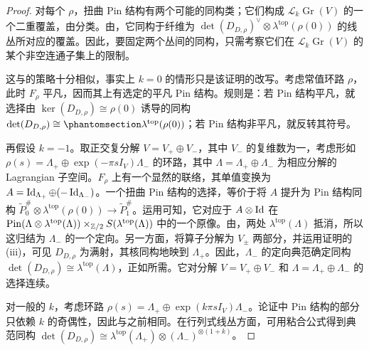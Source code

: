 \begin{proof}
对每个 $\rho$，扭曲 Pin 结构有两个可能的同构类；它们构成 $\mathcal L_k\operatorname{Gr}(V)$ 的一个二重覆盖，由分类。由，它同构于纤维为 $\det(D_{D,\allowbreak \rho})^\vee\otimes\lambda^{\mathrm{top}}(\rho(0))$ 的线丛所对应的覆盖。因此，要固定两个丛间的同构，只需考察它们在 $\mathcal L_k\operatorname{Gr}(V)$ 的某个非空连通子集上的限制。

这与的策略十分相似，事实上 $k=0$ 的情形只是该证明的改写。考虑常值环路 $\rho$，此时 $F_\rho$ 平凡，因而其上有选定的平凡 Pin 结构。规则是：若 Pin 结构平凡，就选择由 $\ker(D_{D,\allowbreak \rho})\cong\rho(0)$ 诱导的同构 $\det(D_{D,\allowbreak \rho})\cong
\SourcePage{177}
\lambda^{\mathrm{top}}(\rho(0))$；若 Pin 结构非平凡，就反转其符号。

再假设 $k=-1$。取正交复分解 $V=V_+\oplus V_-$，其中 $V_-$ 的复维数为一，考虑形如 $\rho(s)=\Lambda_+\oplus\exp(-\pi sI_V)\Lambda_-$ 的环路，其中 $\Lambda=\Lambda_+\oplus\Lambda_-$ 为相应分解的 Lagrangian 子空间。$F_\rho$ 上有一个显然的联络，其单值变换为 $A=\operatorname{Id}_{\Lambda_+}\oplus(-\operatorname{Id}_{\Lambda_-})$。一个扭曲 Pin 结构的选择，等价于将 $A$ 提升为 Pin 结构同构 $\widetilde P_0^\#\otimes\lambda^{\mathrm{top}}(\rho(0))\to\widetilde P_1^\#$。运用可知，它对应于 $A\otimes\operatorname{Id}$ 在 $\operatorname{Pin}(\Lambda\otimes\lambda^{\mathrm{top}}(\Lambda))\times_{\mathbb Z/2}S(\lambda^{\mathrm{top}}(\Lambda))$ 中的一个原像。由，两处 $\lambda^{\mathrm{top}}(\Lambda)$ 抵消，所以这归结为 $\Lambda_-$ 的一个定向。另一方面，将算子分解为 $V_\pm$ 两部分，并运用证明的 (iii)，可见 $D_{D,\allowbreak \rho}$ 为满射，其核同构地映到 $\Lambda_+$。因此，$\Lambda_-$ 的定向典范确定同构 $\det(D_{D,\allowbreak \rho})\cong\lambda^{\mathrm{top}}(\Lambda)$，正如所需。它对分解 $V=V_+\oplus V_-$ 和 $\Lambda=\Lambda_+\oplus\Lambda_-$ 的选择连续。

对一般的 $k$，考虑环路 $\rho(s)=\Lambda_+\oplus\exp(k\pi sI_V)\Lambda_-$。论证中 Pin 结构的部分只依赖 $k$ 的奇偶性，因此与之前相同。在行列式线丛方面，可用粘合公式得到典范同构 $\det(D_{D,\allowbreak \rho})\cong\lambda^{\mathrm{top}}(\Lambda_+)\otimes(\Lambda_-)^{\otimes(1+k)}$。
\end{proof}
